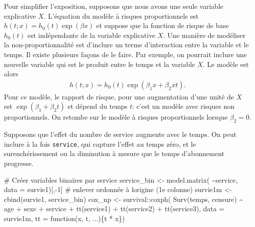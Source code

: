 \documentclass[
  11pt,
  letterpaper,
]{book}
\newenvironment{Shaded}{\begin{snugshade}}{\end{snugshade}}
\newcommand{\AttributeTok}[1]{\textcolor[rgb]{0.40,0.45,0.13}{#1}}
\newcommand{\CommentTok}[1]{\textcolor[rgb]{0.37,0.37,0.37}{#1}}
\newcommand{\ControlFlowTok}[1]{\textcolor[rgb]{0.00,0.23,0.31}{#1}}
\newcommand{\DecValTok}[1]{\textcolor[rgb]{0.68,0.00,0.00}{#1}}
\newcommand{\FunctionTok}[1]{\textcolor[rgb]{0.28,0.35,0.67}{#1}}
\newcommand{\NormalTok}[1]{\textcolor[rgb]{0.00,0.23,0.31}{#1}}
\newcommand{\OtherTok}[1]{\textcolor[rgb]{0.00,0.23,0.31}{#1}}
\newcommand{\SpecialCharTok}[1]{\textcolor[rgb]{0.37,0.37,0.37}{#1}}
\theoremstyle{definition}
\theoremstyle{remark}
\begin{document}
Pour simplifier l'exposition, supposons que nous avons une seule
variable explicative \(X\). L'équation du modèle à risques
proportionnels est \(h(t; x) = h_0(t)\exp(\beta x)\) et suppose que la
fonction de risque de base \(h_0(t)\) est indépendante de la variable
explicative \(X\). Une manière de modéliser la non-proportionnalité est
d'inclure un terme d'interaction entre la variable et le temps. Il
existe plusieurs façons de le faire. Par exemple, on pourrait inclure
une nouvelle variable qui est le produit entre le temps et la variable
\(X\). Le modèle est alors \begin{align*}
h(t; x) = h_0(t) \exp(\beta_1x + \beta_2xt).
\end{align*} Pour ce modèle, le rapport de risque, pour une augmentation
d'une unité de \(X\) est \(\exp(\beta_1+ \beta_2t)\) et dépend du temps
\(t\): c'est un modèle avec risques non proportionnels. On retombe sur
le modèle à risques proportionnels lorsque \(\beta_2=0\).

Supposons que l'effet du nombre de service augmente avec le temps. On
peut inclure à la fois \texttt{service}, qui capture l'effet au temps
zéro, et le surenchérissement ou la diminution à mesure que le temps
d'abonnement progresse.

\begin{Shaded}
\begin{Highlighting}[]
\CommentTok{\# Créer variables binaires par service}
\NormalTok{service\_bin }\OtherTok{\textless{}{-}} \FunctionTok{model.matrix}\NormalTok{(}
  \SpecialCharTok{\textasciitilde{}}\NormalTok{service, }
  \AttributeTok{data =}\NormalTok{ survie1)[,}\SpecialCharTok{{-}}\DecValTok{1}\NormalTok{]}
\CommentTok{\# enlever ordonnée à l\textquotesingle{}origine (1e colonne)}
\NormalTok{survie1m }\OtherTok{\textless{}{-}} \FunctionTok{cbind}\NormalTok{(survie1, service\_bin) }
\NormalTok{cox\_np }\OtherTok{\textless{}{-}}\NormalTok{ survival}\SpecialCharTok{::}\FunctionTok{coxph}\NormalTok{(}
    \FunctionTok{Surv}\NormalTok{(temps, censure) }\SpecialCharTok{\textasciitilde{}} 
\NormalTok{     age }\SpecialCharTok{+}\NormalTok{ sexe }\SpecialCharTok{+}\NormalTok{ service }\SpecialCharTok{+} 
      \FunctionTok{tt}\NormalTok{(service1) }\SpecialCharTok{+} \FunctionTok{tt}\NormalTok{(service2) }\SpecialCharTok{+} \FunctionTok{tt}\NormalTok{(service3), }
     \AttributeTok{data =}\NormalTok{ survie1m, }
     \AttributeTok{tt =} \ControlFlowTok{function}\NormalTok{(x, t, ...)\{t }\SpecialCharTok{*}\NormalTok{ x\})}
\end{Highlighting}
\end{Shaded}
\end{document}
